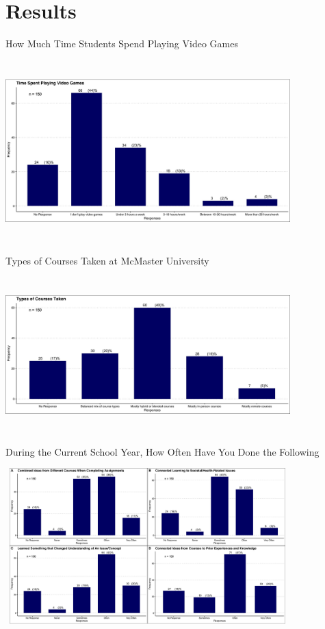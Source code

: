\documentclass{beamer}
\begin{document}
	\section{Results}
	
	\begin{frame}{How Much Time Students Spend Playing Video Games}
		\begin{center}
		\includegraphics[width=11cm, height=7cm]{time_spent_playing_videogames.jpg}
		\end{center}
	\end{frame}

	\begin{frame}{Types of Courses Taken at McMaster University}
		\begin{center}
		\includegraphics[width=11cm, height=6cm]{types_of_courses_taken.jpg}
		\end{center}
	\end{frame}

	\begin{frame}{During the Current School Year, How Often Have You Done the Following}
		\begin{center}
			\includegraphics[width=11cm, height=6cm]{how_often_haveyou_done_thefollowing.jpg}
		\end{center}
	\end{frame}
\end{document}
